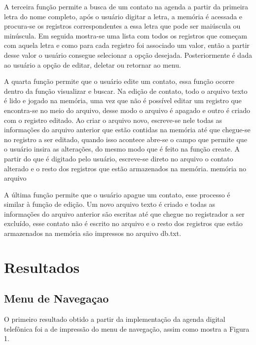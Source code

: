 \documentclass[10pt,twocolumn,letterpaper]{article}
\begin{document}
A terceira função permite a busca de um contato na agenda a partir da primeira letra do nome completo, após o usuário digitar a letra, a memória é acessada e procura-se os registros correspondentes a essa letra que pode ser maiúscula ou minúscula. Em seguida mostra-se uma lista com todos os registros que começam com aquela letra e como para cada registro foi associado um valor, então a partir desse valor o usuário consegue selecionar a opção desejada. Posteriormente é dada ao usuário a opção de editar, deletar ou retornar ao menu.

A quarta função permite que o usuário edite um contato, essa função ocorre dentro da função visualizar e buscar. Na edição de contato, todo o arquivo texto é lido e jogado na memória, uma vez que não é possível editar um registro que encontra-se no meio do arquivo, desse modo o arquivo é apagado e outro é criado com o registro editado. Ao criar o arquivo novo, escreve-se nele todas as informações do arquivo anterior que estão contidas na memória até que chegue-se no registro a ser editado, quando isso acontece abre-se o campo que permite que o usuário insira as alterações, do mesmo modo que é feito na função create. A partir do que é digitado pelo usuário, escreve-se direto no arquivo o contato alterado e o resto dos registros que estão armazenados na memória.
 memória no arquivo

A última função permite que o usuário apague um contato, esse processo é similar à função de edição. Um novo arquivo texto é criado e todas as informações do arquivo anterior são escritas até que chegue no registrador a ser excluído, esse contato não é escrito no arquivo e o resto dos registros que estão armazenados na memória são impressos no arquivo db.txt.

\section{Resultados}

\subsection{Menu de Navegaçao}

O primeiro resultado obtido a partir da implementação da agenda digital telefônica foi a de impressão do menu de navegação, assim como mostra a Figura 1.
\end{document}
